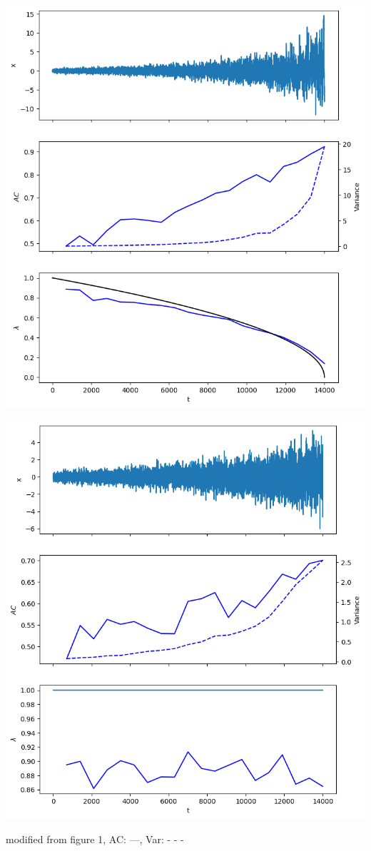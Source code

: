 \documentclass[%
thesis=student,%
coverpage=false,%
titlepage=false,%
headmarks=true, %
german,%
font=libertine, %
math=newpxtx, %
BCOR=5mm,%
coverBCOR=11mm%
]{tumbook}
\begin{document}
\begin{minipage}{0.49\textwidth}
        \centering
        \includegraphics[width=\textwidth]{figures/true_positive.png}
    \end{minipage}
    \hfill
    \begin{minipage}{0.49\textwidth}
        \centering
        \includegraphics[width=\textwidth]{figures/false_positives.png}
    \end{minipage}
    \begin{minipage}{\textwidth}
    \centering
    modified from \cite{Morr:2024} figure 1, AC: ---, Var: - - -
\end{minipage}
\end{document}
